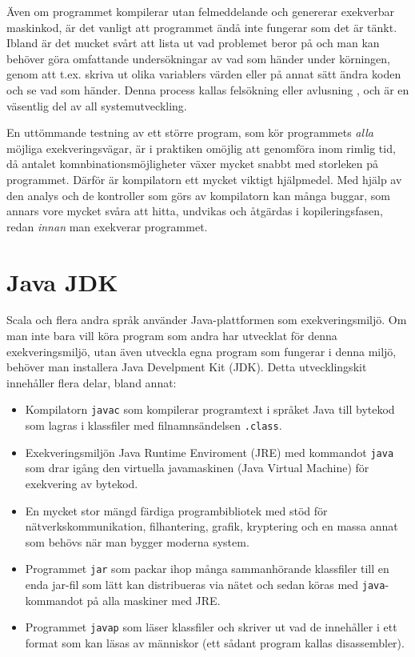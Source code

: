 Även om programmet kompilerar utan felmeddelande och genererar exekverbar maskinkod, är det vanligt att programmet ändå inte fungerar som det är tänkt. Ibland är det mucket svårt att lista ut vad problemet beror på och man kan behöver göra omfattande undersökningar av vad som händer under körningen, genom att t.ex. skriva ut olika variablers värden eller på annat sätt ändra koden och se vad som händer. Denna process kallas felsökning eller avlusning , och är en väsentlig del av all systemutveckling. 

En uttömmande testning av ett större program, som kör programmets \textit{alla} möjliga exekveringsvägar, är i praktiken omöjlig att genomföra inom rimlig tid, då antalet komnbinationsmöjligheter växer mycket snabbt med storleken på programmet. 
Därför är kompilatorn ett mycket viktigt hjälpmedel. Med hjälp av den analys och de kontroller som görs av kompilatorn kan många buggar, som annars vore mycket svåra att hitta, undvikas och åtgärdas i kopileringsfasen, redan \textit{innan} man exekverar programmet. 


\section{Java JDK}

Scala och flera andra språk använder Java-plattformen som exekveringsmiljö. Om man inte bara vill köra program som andra har utvecklat för denna exekveringsmiljö, utan även utveckla egna program som fungerar i denna miljö, behöver man installera Java Develpment Kit (JDK). Detta utvecklingskit innehåller flera delar, bland annat:
\begin{itemize}
\item Kompilatorn \texttt{javac} som kompilerar programtext i språket Java till bytekod som lagras i klassfiler med filnamnsändelsen \texttt{.class}.
\item Exekveringsmiljön Java Runtime Enviroment (JRE) med kommandot \texttt{java} som drar igång den virtuella javamaskinen (Java Virtual Machine) för exekvering av bytekod.
\item En mycket stor mängd färdiga programbibliotek med stöd för nätverkskommunikation, filhantering, grafik, kryptering och en massa annat som behövs när man bygger moderna system. 
\item Programmet \texttt{jar} som packar ihop många sammanhörande klassfiler till en enda jar-fil som lätt kan distribueras via nätet och sedan köras med \texttt{java}-kommandot på alla maskiner med JRE. 
\item Programmet \texttt{javap} som läser klassfiler och skriver ut vad de innehåller i ett format som kan läsas av människor (ett sådant program kallas disassembler).
\end{itemize}  

